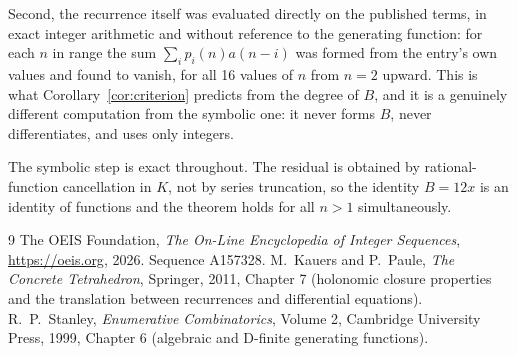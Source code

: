 \documentclass[11pt,a4paper]{article}
\theoremstyle{plain}
\theoremstyle{definition}
\begin{document}
Second, the recurrence itself was evaluated directly on the published terms, in exact
integer arithmetic and without reference to the generating function: for each $n$ in range
the sum $\sum_{i}p_{i}(n)a(n-i)$ was formed from the entry's own values and found to
vanish, for all 16 values of $n$ from $n=2$ upward. This is what
Corollary~\ref{cor:criterion} predicts from the degree of $B$, and it is a genuinely
different computation from the symbolic one: it never forms $B$, never differentiates, and
uses only integers.

The symbolic step is exact throughout. The residual is obtained by rational-function
cancellation in $K$, not by series truncation, so the identity $B=12 x$ is an
identity of functions and the theorem holds for all $n>1$ simultaneously.

\begin{thebibliography}{9}
 The OEIS Foundation, \emph{The On-Line Encyclopedia of Integer Sequences},
\url{https://oeis.org}, 2026. Sequence A157328.
 M.~Kauers and P.~Paule, \emph{The Concrete Tetrahedron}, Springer, 2011,
Chapter 7 (holonomic closure properties and the translation between recurrences and
differential equations).
 R.~P.~Stanley, \emph{Enumerative Combinatorics}, Volume 2, Cambridge
University Press, 1999, Chapter 6 (algebraic and D-finite generating functions).
\end{thebibliography}
\end{document}
